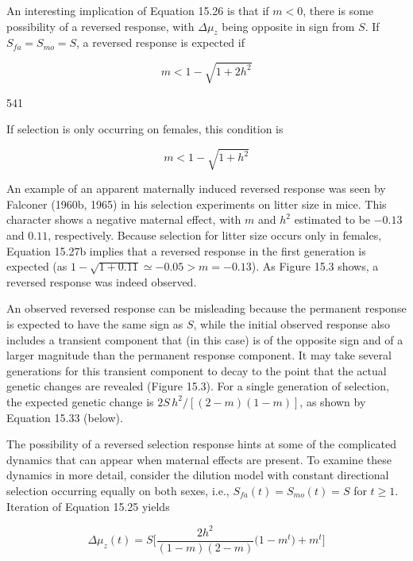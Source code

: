 \documentclass{article}
\begin{document}
An interesting implication of Equation 15.26 is that if $m < 0$, there is some possibility of a reversed response, with $\Delta\mu_z$ being opposite in sign from $S$. If $S_{fa} = S_{mo} = S$, a reversed response is expected if

\begin{equation}
m<1-\sqrt{1+2h^{2}}
\tag{15.27a}
\label{eq:15_27a}
\end{equation}

541

If selection is only occurring on females, this condition is

\begin{equation}
m<1-\sqrt{1+h^{2}}
\tag{15.27b}
\label{eq:15_27b}
\end{equation}

An example of an apparent maternally induced reversed response was seen by Falconer (1960b, 1965) in his selection experiments on litter size in mice. This character shows a negative maternal effect, with  $ m $ and  $ h^2 $ estimated to be  $ -0.13 $ and  $ 0.11 $, respectively. Because selection for litter size occurs only in females, Equation 15.27b implies that a reversed response in the first generation is expected (as  $ 1 - \sqrt{1 + 0.11} \simeq -0.05 > m = -0.13 $). As Figure 15.3 shows, a reversed response was indeed observed.

An observed reversed response can be misleading because the permanent response is expected to have the same sign as $S$, while the initial observed response also includes a transient component that (in this case) is of the opposite sign and of a larger magnitude than the permanent response component. It may take several generations for this transient component to decay to the point that the actual genetic changes are revealed (Figure 15.3). For a single generation of selection, the expected genetic change is $2S\,h^{2}/[(2-m)(1-m)]$, as shown by Equation 15.33 (below).

The possibility of a reversed selection response hints at some of the complicated dynamics that can appear when maternal effects are present. To examine these dynamics in more detail, consider the dilution model with constant directional selection occurring equally on both sexes, i.e.,  $ S_{fa}(t) = S_{mo}(t) = S $ for  $ t \geq 1 $. Iteration of Equation 15.25 yields

\begin{equation}
\Delta\mu_{z}(t)=S\bigg[\frac{2h^{2}}{(1-m)(2-m)}\bigg(1-m^{t}\bigg)+m^{t}\bigg]
\tag{15.28a}
\label{eq:15_28a}
\end{equation}
\end{document}
